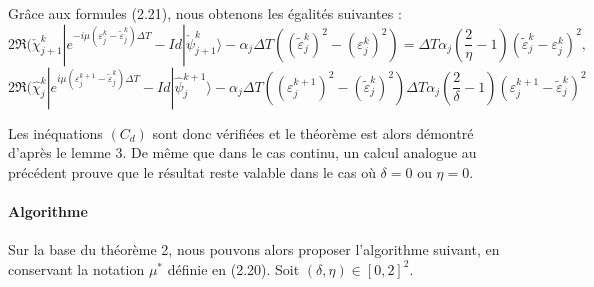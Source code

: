 \begin{ proof }
	Grâce aux formules (2.21), nous obtenons les égalités suivantes :
	$$2\Re(\check{\chi}^k_{j+1}|e^{-i\mu(\varepsilon^k_j-\tilde{\varepsilon}^k_j)\Delta T}-Id|\check{\psi}^k_{j+1}\rangle - \alpha_j \Delta T ((\tilde{\varepsilon}^k_j)^2-(\varepsilon^k_j)^2) = \Delta T \alpha_j(\frac{2}{\eta}-1)(\tilde{\varepsilon}_j^k - \varepsilon^k_j)^2,$$
	$$ 2\Re(\hat{\chi}^k_j|e^{i\mu(\varepsilon^{k+1}_j-\tilde{\varepsilon}^k_j)\Delta T}-Id|\hat{\psi}^{k+1}_j\rangle - \alpha_j \Delta T ((\varepsilon^{k+1}_j)^2-(\tilde{\varepsilon}^k_j)^2)\Delta T \alpha_j(\frac{2}{\delta}-1)(\varepsilon^{k+1}_j-\tilde{\varepsilon}^k_j)^2$$
	
	Les inéquations $(C_d)$ sont donc vérifiées et le théorème est alors démontré d'après le lemme 3. De même que dans le cas continu, un calcul analogue au précédent prouve que le résultat reste valable dans le cas où $ \delta = 0$ ou $\eta = 0$.
\end{ proof }

\paragraph*{Algorithme}
$ $\\Sur la base du théorème 2, nous pouvons alors proposer l'algorithme suivant, en conservant la notation $\mu^*$ définie en (2.20). Soit $(\delta, \eta) \in [0, 2]^2$.

